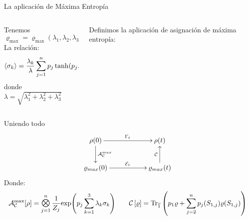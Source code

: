 \begin{frame}{La aplicación de Máxima Entropía}
    \begin{columns}
        \begin{column}{0.5\textwidth}
            Tenemos
            \begin{equation}
                \varrho_{\max}=\varrho_{\max}(\lambda_{1},\lambda_{2},\lambda_{3})\nonumber
            \end{equation}\pause
            La relación:
            \begin{equation}
                \expval{\sigma_{k}}=\frac{\lambda_{k}}{\lambda}\sum_{j=1}^{n}p_{j}\tanh(p_{j}\lambda)\nonumber
            \end{equation}\pause
            donde $\lambda=\sqrt{\lambda_{1}^{2}+\lambda_{2}^{2}+\lambda_{3}^{2}}$
        \end{column}
        \pause
        \begin{column}{0.5\textwidth}
            Definimos la aplicación de asignación de máxima entropía:
        \end{column}
    \end{columns}
\end{frame}


\begin{frame}{Uniendo todo}
    \begin{displaymath}
        \xymatrix{
          {\rho(0)} \ar[rr]^{\Gamma_{t}} \ar[d]^{\mcA^{max}_{\mcC}}
          && {\rho(t)}\\
          {\varrho_{max}(0)} \ar[rr]^{\mcE_{t}}
          && {\varrho_{max}(t)} \ar[u]^{\mcC}
        }
      \end{displaymath}\pause
      Donde:
        \begin{equation}
            \mcA_{\mcC}^{\max}[\rho]=\Motimes_{j=1}^{n}\frac{1}{Z_{j}}\text{exp}\qty(p_{j}\sum_{k=1}^{3}\lambda_{k}\sigma_{k}) \qquad \CG{\varrho}=\Tr_{\overline{1}}\qty(p_{1}\varrho+\sum_{j=2}^{n}p_{j}(S_{1,j})\varrho(S_{1,j}))\nonumber
        \end{equation}\pause
        \begin{center}
        \end{center}
\end{frame}
